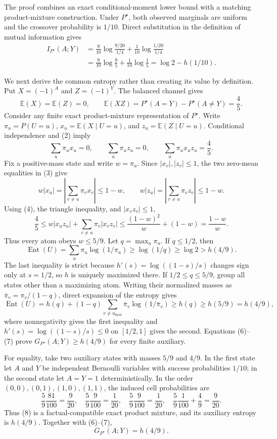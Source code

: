 The proof combines an exact conditional-moment lower bound with a matching product-mixture construction. Under \(P^\star\), both observed marginals are uniform and the crossover probability is \(1/10\). Direct substitution in the definition of mutual information gives
\[
\begin{aligned}
I_{P^\star}(A;Y)
&=\frac9{10}\log\frac{9/20}{1/4}
  +\frac1{10}\log\frac{1/20}{1/4}\\
&=\frac9{10}\log\frac95+\frac1{10}\log\frac15
=\log2-h(1/10).
\end{aligned}
\tag{1}
\]

We next derive the common entropy rather than creating its value by definition. Put \(X=(-1)^A\) and \(Z=(-1)^Y\). The balanced channel gives
\[
\mathbb E(X)=\mathbb E(Z)=0,
\qquad
\mathbb E(XZ)=P^\star(A=Y)-P^\star(A\neq Y)=\frac45.
\tag{2}
\]
Consider any finite exact product-mixture representation of \(P^\star\). Write \(\pi_u=P(U=u)\), \(x_u=\mathbb E(X\mid U=u)\), and \(z_u=\mathbb E(Z\mid U=u)\). Conditional independence and (2) imply
\[
\sum_u\pi_u x_u=0,
\qquad
\sum_u\pi_u z_u=0,
\qquad
\sum_u\pi_u x_uz_u=\frac45.
\tag{3}
\]
Fix a positive-mass state and write \(w=\pi_u\). Since \(|x_v|,|z_v|\leq1\), the two zero-mean equalities in (3) give
\[
w|x_u|
=\left|\sum_{v\neq u}\pi_vx_v\right|\leq1-w,
\qquad
w|z_u|
=\left|\sum_{v\neq u}\pi_vz_v\right|\leq1-w.
\tag{4}
\]
Using (4), the triangle inequality, and \(|x_vz_v|\leq1\),
\[
\frac45
\leq w|x_uz_u|+\sum_{v\neq u}\pi_v|x_vz_v|
\leq\frac{(1-w)^2}{w}+(1-w)
=\frac{1-w}{w}.
\tag{5}
\]
Thus every atom obeys \(w\leq5/9\). Let \(q=\max_u\pi_u\). If \(q\leq1/2\), then
\[
\operatorname{Ent}(U)
=\sum_u\pi_u\log(1/\pi_u)
\geq\log(1/q)\geq\log2>h(4/9).
\tag{6}
\]
The last inequality is strict because \(h'(s)=\log((1-s)/s)\) changes sign only at \(s=1/2\), so \(h\) is uniquely maximized there.
If \(1/2\leq q\leq5/9\), group all states other than a maximizing atom. Writing their normalized masses as \(\bar\pi_v=\pi_v/(1-q)\), direct expansion of the entropy gives
\[
\operatorname{Ent}(U)
=h(q)+(1-q)\sum_{v\neq u_{\max}}\bar\pi_v\log(1/\bar\pi_v)
\geq h(q)\geq h(5/9)=h(4/9),
\tag{7}
\]
where nonnegativity gives the first inequality and \(h'(s)=\log((1-s)/s)\leq0\) on \([1/2,1]\) gives the second. Equations (6)--(7) prove \(G_{P^\star}(A;Y)\geq h(4/9)\) for every finite auxiliary.

For equality, take two auxiliary states with masses \(5/9\) and \(4/9\). In the first state let \(A\) and \(Y\) be independent Bernoulli variables with success probabilities \(1/10\); in the second state let \(A=Y=1\) deterministically. In the order \((0,0),(0,1),(1,0),(1,1)\), the induced cell probabilities are
\[
\frac59\frac{81}{100}=\frac9{20},
\quad
\frac59\frac9{100}=\frac1{20},
\quad
\frac59\frac9{100}=\frac1{20},
\quad
\frac59\frac1{100}+\frac49=\frac9{20}.
\tag{8}
\]
Thus (8) is a factual-compatible exact product mixture, and its auxiliary entropy is \(h(4/9)\). Together with (6)--(7),
\[
G_{P^\star}(A;Y)=h(4/9).
\tag{9}
\]

